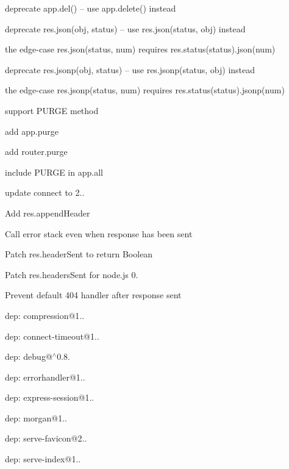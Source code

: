 \begin{DoxyItemize}
\item deprecate {\ttfamily app.\+del()} -- use {\ttfamily app.\+delete()} instead
\item deprecate {\ttfamily res.\+json(obj, status)} -- use {\ttfamily res.\+json(status, obj)} instead
\begin{DoxyItemize}
\item the edge-\/case {\ttfamily res.\+json(status, num)} requires {\ttfamily res.\+status(status).json(num)}
\end{DoxyItemize}
\item deprecate {\ttfamily res.\+jsonp(obj, status)} -- use {\ttfamily res.\+jsonp(status, obj)} instead
\begin{DoxyItemize}
\item the edge-\/case {\ttfamily res.\+jsonp(status, num)} requires {\ttfamily res.\+status(status).jsonp(num)}
\end{DoxyItemize}
\item support P\+U\+R\+G\+E method
\begin{DoxyItemize}
\item add {\ttfamily app.\+purge}
\item add {\ttfamily router.\+purge}
\item include P\+U\+R\+G\+E in {\ttfamily app.\+all}
\end{DoxyItemize}
\item update connect to 2..
\begin{DoxyItemize}
\item Add {\ttfamily res.\+append\+Header}
\item Call error stack even when response has been sent
\item Patch {\ttfamily res.\+header\+Sent} to return Boolean
\item Patch {\ttfamily res.\+headers\+Sent} for node.\+js 0.
\item Prevent default 404 handler after response sent
\item dep\+: compression@1..
\item dep\+: connect-\/timeout@1..
\item dep\+: debug@$^\wedge$0.8.
\item dep\+: errorhandler@1..
\item dep\+: express-\/session@1..
\item dep\+: morgan@1..
\item dep\+: serve-\/favicon@2..
\item dep\+: serve-\/index@1..

\end{DoxyItemize}
\end{DoxyItemize}
